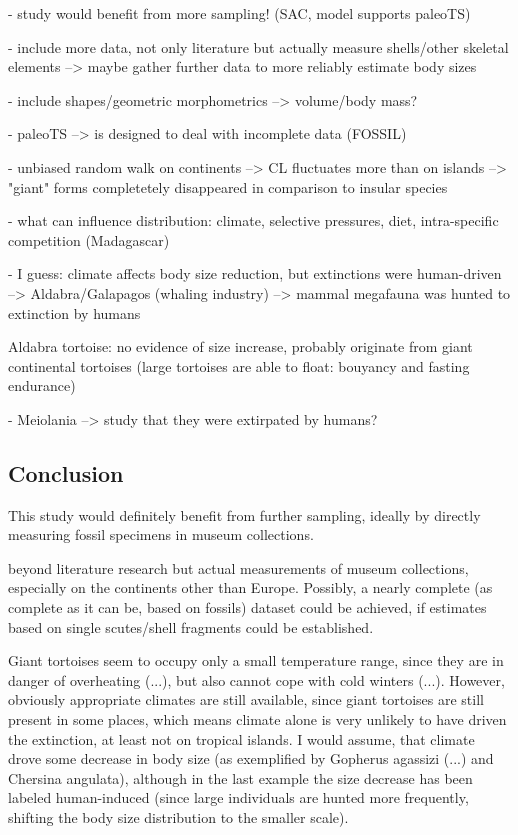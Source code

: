 - study would benefit from more sampling! (SAC, model supports paleoTS)

- include more data, not only literature but actually measure shells/other skeletal elements --> maybe gather further data to more reliably estimate body sizes

- include shapes/geometric morphometrics --> volume/body mass?

- paleoTS --> is designed to deal with incomplete data (FOSSIL)

- unbiased random walk on continents --> CL fluctuates more than on islands --> "giant" forms completetely disappeared in comparison to insular species

- what can influence distribution: climate, selective pressures, diet, intra-specific competition (Madagascar)

- I guess: climate affects body size reduction, but extinctions were human-driven
--> Aldabra/Galapagos (whaling industry)
--> mammal megafauna was hunted to extinction by humans





Aldabra tortoise: no evidence of size increase, probably originate from giant continental tortoises (large tortoises are able to float: bouyancy and fasting endurance)

- Meiolania --> study that they were extirpated by humans?

\subsection{Conclusion}


This study would definitely benefit from further sampling, ideally by directly measuring fossil specimens in museum collections.

beyond literature research but actual measurements of museum collections, especially on the continents other than Europe. Possibly, a nearly complete (as complete as it can be, based on fossils) dataset could be achieved, if estimates based on single scutes/shell fragments could be established.

Giant tortoises seem to occupy only a small temperature range, since they are in danger of overheating (...), but also cannot cope with cold winters (...). However, obviously appropriate climates are still available, since giant tortoises are still present in some places, which means climate alone is very unlikely to have driven the extinction, at least not on tropical islands.
I would assume, that climate drove some decrease in body size (as exemplified by Gopherus agassizi (...) and Chersina angulata), although in the last example the size decrease has been labeled human-induced (since large individuals are hunted more frequently, shifting the body size distribution to the smaller scale).


